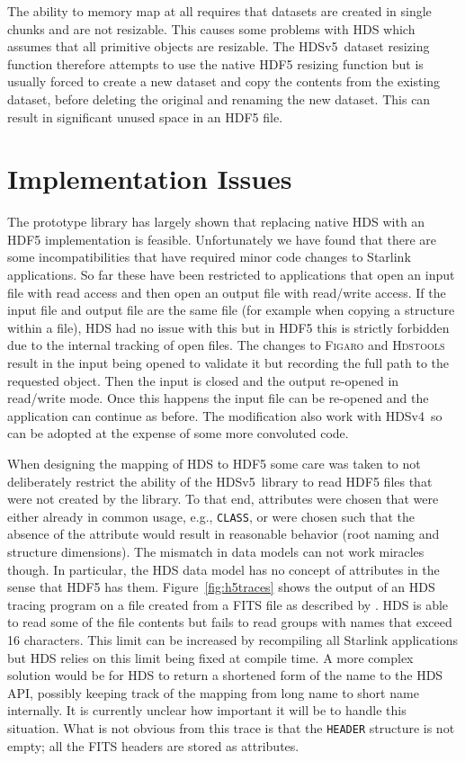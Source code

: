 \documentclass[final,authoryear,5p,times,twocolumn]{elsarticle}
\newcommand{\new}{HDSv5}
\newcommand{\old}{HDSv4}
\begin{document}
The ability to memory map at all requires that datasets are created in
single chunks and are not resizable. This causes some problems with
HDS which assumes that all primitive objects are resizable. The \new\
dataset resizing function therefore attempts to use the native
HDF5 resizing function but is usually forced to create a new dataset
and copy the contents from the existing dataset, before deleting the
original and renaming the new dataset. This can result in significant
unused space in an HDF5 file.

\section{Implementation Issues}

The prototype library has largely shown that replacing native HDS with
an HDF5 implementation is feasible. Unfortunately we have found that
there are some incompatibilities that have required minor code changes
to Starlink applications. So far these have been restricted to
applications that open an input file with read access and then open an
output file with read/write access. If the input file and output file
are the same file (for example when copying a structure within a
file), HDS had no issue with this but in HDF5 this is strictly
forbidden due to the internal tracking of open files. The changes to
\textsc{Figaro} \citep[][\ascl{1203.013}]{1993ASPC...52..219S} and
\textsc{Hdstools} \citep{SUN245} result in the input being opened to
validate it but recording the full path to the requested object. Then
the input is closed and the output re-opened in read/write mode. Once
this happens the input file can be re-opened and the application can
continue as before. The modification also work with \old\ so can be
adopted at the expense of some more convoluted code.

When designing the mapping of HDS to HDF5 some care was taken to not
deliberately restrict the ability of the \new\ library to read HDF5
files that were not created by the library. To that end, attributes
were chosen that were either already in common usage, e.g.,
\texttt{CLASS}, or were chosen such that the absence of the attribute
would result in reasonable behavior (root naming and structure
dimensions). The mismatch in data models can not work miracles
though. In particular, the HDS data model has no concept of attributes
in the sense that HDF5 has them. Figure~\ref{fig:h5traces} shows the
output of an HDS tracing program on a file created from a FITS file
as described by \citet{O4-4_adassxxiv}. HDS is able to read some of
the file contents but fails to read groups with names that exceed 16
characters. This limit can be increased by recompiling all Starlink
applications but HDS relies on this limit being fixed at compile time.
A more complex solution would be for HDS to return a shortened form of
the name to the HDS API, possibly keeping track of the mapping from
long name to short name internally. It is currently unclear how
important it will be to handle this situation. What is not obvious
from this trace is that the \texttt{HEADER} structure is not empty;
all the FITS headers are stored as attributes.
\end{document}
